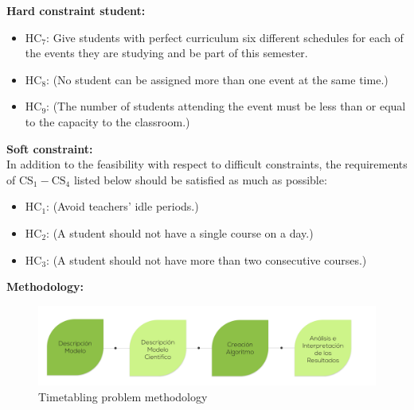\documentclass[centering]{report}
\newenvironment{slide}
    {\newpage
    \vspace*{\fill}
    }
    { 
     \vspace*{\fill}
    }
\begin{document}
\begin{slide}
\textbf{Hard constraint student:}\\

\begin{itemize}
\item $\mathrm{HC_{7}}$: {Give students with perfect curriculum six different schedules for each of the events they are studying and be part of this semester.}
\item $\mathrm{HC_{8}}$: {\color{gray}(No student can be assigned more than one event at the same time.)}
\item $\mathrm{HC_{9}}$: {\color{gray}(The number of students attending the event must be less than or equal to the capacity to the classroom.)}
\end{itemize}
\end{slide}

\begin{slide}
\textbf{Soft constraint:}\\

In addition to the feasibility with respect to difficult constraints, the requirements of $ \mathrm {CS_{1}-CS_{4}} $ listed below should be satisfied as much as possible:

\begin{itemize}
\item $\mathrm{HC_{1}}$: {\color{gray}(Avoid teachers' idle periods.)}
\item $\mathrm{HC_{2}}$: {\color{gray}(A student should not have a single course on a day.)}
\item $\mathrm{HC_{3}}$: {\color{gray}(A student should not have more than two consecutive courses.)}
\end{itemize}

\end{slide}

\begin{slide}
\textbf{Methodology:}\\

\begin{figure}[h!]
  \centering
  \includegraphics[width=1\linewidth]{methodologyflow.png}
  \caption{\label{fig:methodologyflow}Timetabling problem methodology}
\end{figure}
\end{slide}
\end{document}
